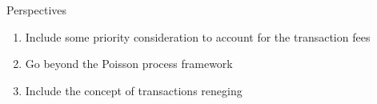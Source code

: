 \documentclass{beamer}
\begin{document}
\begin{frame}{Perspectives}
\begin{enumerate}
  \item  Include some priority consideration to account for the transaction fees 



  \item \normalsize Go beyond the Poisson process framework
  \item Include the concept of transactions reneging



\end{enumerate}

\end{frame}
\end{document}
